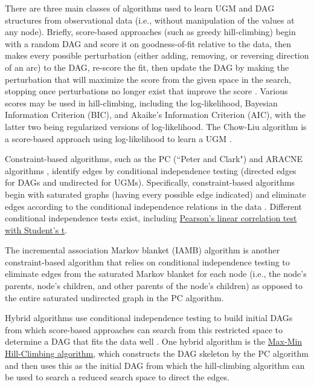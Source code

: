 \documentclass[conference]{IEEEtran}
\begin{document}
There are three main classes of algorithms used to learn UGM and DAG structures from observational data (i.e., without manipulation of the values at any node). Briefly, score-based approaches (such as greedy hill-climbing) begin with a random DAG and score it on goodness-of-fit relative to the data, then makes every possible perturbation (either adding, removing, or reversing direction of an arc) to the DAG, re-score the fit, then update the DAG by making the perturbation that will maximize the score from the given space in the search, stopping once perturbations no longer exist that improve the score \cite{b9}. Various scores may be used in hill-climbing, including the log-likelihood, Bayesian Information Criterion (BIC), and Akaike's Information Criterion (AIC), with the latter two being regularized versions of log-likelihood. The Chow-Liu algorithm is a score-based approach using log-likelihood to learn a UGM \cite{b10}.

Constraint-based algorithms, such as the PC (``Peter and Clark") and ARACNE algorithms \cite{b11}, identify edges by conditional independence testing (directed edges for DAGs and undirected for UGMs). Specifically, constraint-based algorithms begin with saturated graphs (having every possible edge indicated) and eliminate edges according to the conditional independence relations in the data \cite{b9}. Different conditional independence tests exist, including \href{http://www.bnlearn.com/documentation/man/conditional.independence.tests.html}{Pearson's linear correlation test with Student's t}. 

The incremental association Markov blanket (IAMB) algorithm is another constraint-based algorithm \cite{b12} that relies on conditional independence testing to eliminate edges from the saturated Markov blanket for each node (i.e., the node's parents, node's children, and other parents of the node's children) as opposed to the entire saturated undirected graph in the PC algorithm.

Hybrid algorithms use conditional independence testing to build initial DAGs from which score-based approaches can search from this restricted space to determine a DAG that fits the data well \cite{b9}. One hybrid algorithm is the  \href{https://link.springer.com/article/10.1007/s10994-006-6889-7}{Max-Min Hill-Climbing algorithm}, which constructs the DAG skeleton by the PC algorithm and then uses this as the initial DAG from which the hill-climbing algorithm can be used to search a reduced search space to direct the edges.
\end{document}
